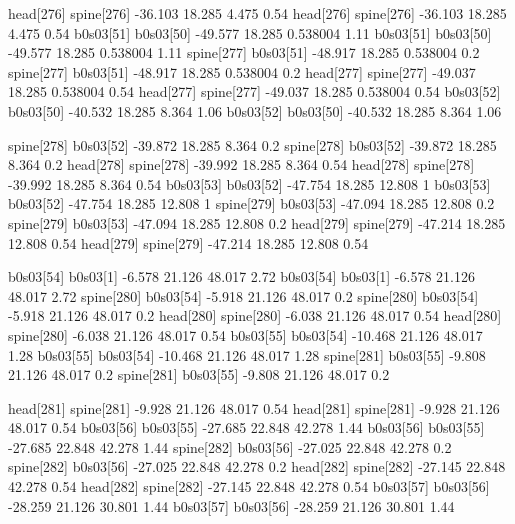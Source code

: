 head[276]    spine[276]    -36.103    18.285    4.475    0.54
head[276]    spine[276]    -36.103    18.285    4.475    0.54
b0s03[51]    b0s03[50]    -49.577    18.285    0.538004    1.11
b0s03[51]    b0s03[50]    -49.577    18.285    0.538004    1.11
spine[277]    b0s03[51]    -48.917    18.285    0.538004    0.2
spine[277]    b0s03[51]    -48.917    18.285    0.538004    0.2
head[277]    spine[277]    -49.037    18.285    0.538004    0.54
head[277]    spine[277]    -49.037    18.285    0.538004    0.54
b0s03[52]    b0s03[50]    -40.532    18.285    8.364    1.06
b0s03[52]    b0s03[50]    -40.532    18.285    8.364    1.06


spine[278]    b0s03[52]    -39.872    18.285    8.364    0.2
spine[278]    b0s03[52]    -39.872    18.285    8.364    0.2
head[278]    spine[278]    -39.992    18.285    8.364    0.54
head[278]    spine[278]    -39.992    18.285    8.364    0.54
b0s03[53]    b0s03[52]    -47.754    18.285    12.808    1
b0s03[53]    b0s03[52]    -47.754    18.285    12.808    1
spine[279]    b0s03[53]    -47.094    18.285    12.808    0.2
spine[279]    b0s03[53]    -47.094    18.285    12.808    0.2
head[279]    spine[279]    -47.214    18.285    12.808    0.54
head[279]    spine[279]    -47.214    18.285    12.808    0.54


b0s03[54]    b0s03[1]    -6.578    21.126    48.017    2.72
b0s03[54]    b0s03[1]    -6.578    21.126    48.017    2.72
spine[280]    b0s03[54]    -5.918    21.126    48.017    0.2
spine[280]    b0s03[54]    -5.918    21.126    48.017    0.2
head[280]    spine[280]    -6.038    21.126    48.017    0.54
head[280]    spine[280]    -6.038    21.126    48.017    0.54
b0s03[55]    b0s03[54]    -10.468    21.126    48.017    1.28
b0s03[55]    b0s03[54]    -10.468    21.126    48.017    1.28
spine[281]    b0s03[55]    -9.808    21.126    48.017    0.2
spine[281]    b0s03[55]    -9.808    21.126    48.017    0.2


head[281]    spine[281]    -9.928    21.126    48.017    0.54
head[281]    spine[281]    -9.928    21.126    48.017    0.54
b0s03[56]    b0s03[55]    -27.685    22.848    42.278    1.44
b0s03[56]    b0s03[55]    -27.685    22.848    42.278    1.44
spine[282]    b0s03[56]    -27.025    22.848    42.278    0.2
spine[282]    b0s03[56]    -27.025    22.848    42.278    0.2
head[282]    spine[282]    -27.145    22.848    42.278    0.54
head[282]    spine[282]    -27.145    22.848    42.278    0.54
b0s03[57]    b0s03[56]    -28.259    21.126    30.801    1.44
b0s03[57]    b0s03[56]    -28.259    21.126    30.801    1.44


